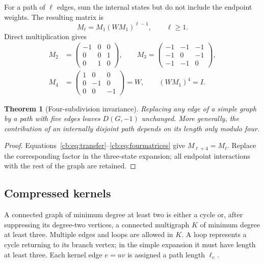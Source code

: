 \documentclass[11pt]{article}
\numberwithin{equation}{section}
\newtheorem{theorem}{Theorem}[section]
\theoremstyle{definition}
\begin{document}
For a path of $\ell$ edges, sum the internal states but do not include the
endpoint weights. The resulting matrix is
\begin{equation}\label{cb:eq:transfer}
 M_\ell=M_1(WM_1)^{\ell-1},\qquad \ell\ge1.
\end{equation}
Direct multiplication gives
\begin{equation}\label{cb:eq:fourmatrices}
\begin{split}
 M_2&=\begin{pmatrix}-1&0&0\\0&0&1\\0&1&0\end{pmatrix},\qquad
 M_3=\begin{pmatrix}-1&-1&-1\\-1&0&-1\\-1&-1&0\end{pmatrix},\\
 M_4&=\begin{pmatrix}1&0&0\\0&-1&0\\0&0&-1\end{pmatrix}=W,
 \qquad (WM_1)^4=I.
\end{split}
\end{equation}

\begin{theorem}[Four-subdivision invariance]\label{cb:thm:period}
Replacing any edge of a simple graph by a path with five edges leaves
$D(G,-1)$ unchanged. More generally, the contribution of an internally
disjoint path depends on its length only modulo four.
\end{theorem}
\begin{proof}
Equations~\eqref{cb:eq:transfer}--\eqref{cb:eq:fourmatrices} give
$M_{\ell+4}=M_\ell$. Replace the corresponding factor in the three-state
expansion; all endpoint interactions with the rest of the graph are retained.
\end{proof}

\subsection{Compressed kernels}
A connected graph of minimum degree at least two is either a cycle or,
after suppressing its degree-two vertices, a connected multigraph $K$
of minimum degree at least three. Multiple edges and loops are allowed
in $K$. A loop represents a cycle returning to its branch vertex; in the
simple expansion it must have length at least three. Each kernel edge
$e=uv$ is assigned a path length $\ell_e$.
\end{document}
